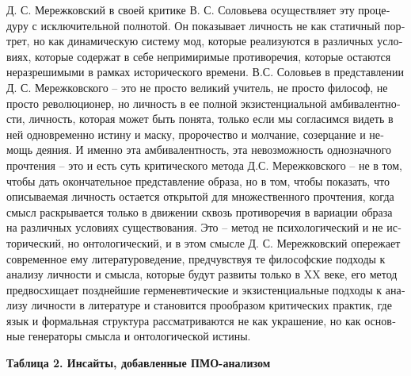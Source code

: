 \begin{russian}
    Д. С. Мережковский в своей критике В. С. Соловьева осуществляет эту процедуру с исключительной полнотой. Он показывает личность не как статичный портрет, но как динамическую систему мод, которые реализуются в различных условиях, которые содержат в себе непримиримые противоречия, которые остаются неразрешимыми в рамках исторического времени.
    В.С. Соловьев в представлении Д. С. Мережковского – это не просто великий учитель, не просто философ, не просто революционер, но личность в ее полной экзистенциальной амбивалентности, личность, которая может быть понята, только если мы согласимся видеть в ней одновременно истину и маску, пророчество и молчание, созерцание и немощь деяния.
    И именно эта амбивалентность, эта невозможность однозначного прочтения – это и есть суть критического метода Д.С. Мережковского – не в том, чтобы дать окончательное представление образа, но в том, чтобы показать, что описываемая личность остается открытой для множественного прочтения, когда смысл раскрывается только в движении сквозь противоречия в вариации образа на различных условиях существования.
    Это – метод не психологический и не исторический, но онтологический, и в этом смысле Д. С. Мережковский опережает современное ему литературоведение, предчувствуя те философские подходы к анализу личности и смысла, которые будут развиты только в XX веке, его метод предвосхищает позднейшие герменевтические и экзистенциальные подходы к анализу личности в литературе и становится прообразом критических практик, где язык и формальная структура рассматриваются не как украшение, но как основные генераторы смысла и онтологической истины.

    \textbf{Таблица 2. Инсайты, добавленные ПМО-анализом}


\end{russian}
